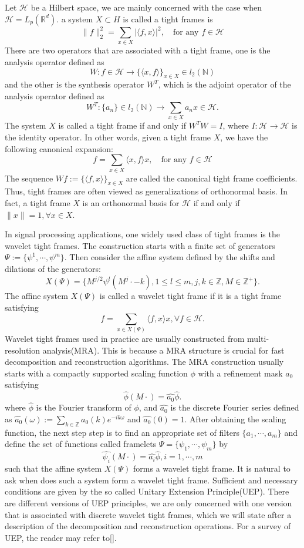 \documentclass[a4paper]{article}
\begin{document}
Let $\mathcal{H}$ be a Hilbert space, we are mainly concerned with the case when $\mathcal{H}=L_p(\mathbb{R}^d)$. a system $X\subset H$ is called a tight frames is
\[
	\|f\|_2^2 = \sum_{x\in X} |\langle f,x\rangle |^2, \quad \textrm{for any } f\in \mathcal{H}
\]
There are two operators that are associated with a tight frame, one is the analysis operator defined as
\[
	W: f\in \mathcal{H} \rightarrow \{\langle x,f\rangle\}_{x\in X} \in l_2(\mathbb{N})
\]
and the other is the synthesis operator $W^T$, which is the adjoint operator of the analysis operator defined as
\[
	W^T : \{a_n\} \in l_2(\mathbb{N}) \rightarrow \sum_{x\in X} a_n x\in \mathcal{H}.
\]
The system $X$ is called a tight frame if and only if $W^TW=I$, where $I: \mathcal{H} \rightarrow \mathcal{H}$ is the identity operator. In other words, given a tight frame $X$, we have the following canonical expansion:
\[
	f=\sum_{x\in X} \langle x,f\rangle x, \quad \textrm{for any } f\in \mathcal{H}
\]
The sequence $Wf:=\{\langle f,x\rangle \}_{x\in X}$ are called the canonical tight frame coefficients. Thus, tight frames are often viewed as generalizations of orthonormal basis. In fact, a tight frame $X$ is an orthonormal basis for $\mathcal{H}$ if and only if $\|x\|=1,\forall x\in X$.

In signal processing applications, one widely used class of tight frames is the wavelet tight frames. The construction starts with a finite set of generators $\Psi:=\{\psi^1,\cdots,\psi^m\}$. Then consider the affine system defined by the shifts and dilations of the generators:
\[
	X(\Psi)=\{M^{j/2}\psi^{l}(M^j\cdot -k),1\leq l\leq m, j,k\in\mathbb{Z}, M\in\mathbb{Z^+}\}.
\]
The affine system $X(\Psi)$ is called a wavelet tight frame if it is a tight frame satisfying
\[
	f=\sum_{x\in X(\Psi)} \langle f,x\rangle x, \forall f \in \mathcal{H}.
\]
Wavelet tight frames used in practice are usually constructed from multi-resolution analysis(MRA). This is because a MRA structure is crucial for fast decomposition and reconstruction algorithms.  The MRA construction usually starts with a compactly supported scaling function $\phi$ with a refinement mask  $a_0$ satisfying
\[
	\hat{\phi}(M\cdot)=\hat{a_0}\hat{\phi}.
\]
where $\hat{\phi}$ is the Fourier transform of $\phi$, and $\hat{a_0}$ is the discrete Fourier series defined as $\hat{a_0}(\omega):=\sum_{k\in\mathbb{Z}} a_0(k) e^{-ik\omega}$ and $\hat{a_0}(0)=1$. After obtaining the scaling function, the next step step is to find an appropriate set of filters $\{a_1,\cdots,a_m\}$ and define the set of functions called framelets $\Psi=\{\psi_1,\cdots,\psi_m\}$ by
\[
	\hat{\psi_i}(M\cdot) = \hat{a_i}\hat{\phi},i=1,\cdots,m
\]
such that the affine system $X(\Psi)$ forms a wavelet tight frame. It is natural to ask when does such a system form a wavelet tight frame. Sufficient and necessary conditions are given by the so called Unitary Extension Principle(UEP). There are different versions of UEP principles, we are only concerned with one version that is associated with discrete wavelet tight frames, which we will state after a description of the decomposition and reconstruction operations. For a survey of UEP, the reader may refer to[].
\end{document}
